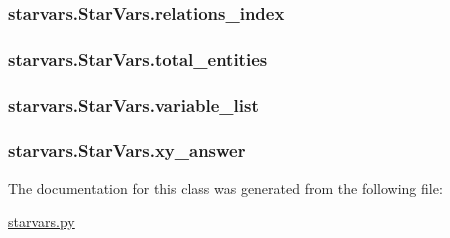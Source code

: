 \hypertarget{classstarvars_1_1StarVars_a228e7e86033c3b18aa6713a71cb17077}{
\subsubsection[{relations\-\_\-index}]{\setlength{\rightskip}{0pt plus 5cm}starvars.\-Star\-Vars.\-relations\-\_\-index}}\label{classstarvars_1_1StarVars_a228e7e86033c3b18aa6713a71cb17077}
\hypertarget{classstarvars_1_1StarVars_ae422b5451a6755af3cbd275608756ed1}{
\subsubsection[{total\-\_\-entities}]{\setlength{\rightskip}{0pt plus 5cm}starvars.\-Star\-Vars.\-total\-\_\-entities}}\label{classstarvars_1_1StarVars_ae422b5451a6755af3cbd275608756ed1}
\hypertarget{classstarvars_1_1StarVars_a49126602e2b9e3b37bf3935ec387997c}{
\subsubsection[{variable\-\_\-list}]{\setlength{\rightskip}{0pt plus 5cm}starvars.\-Star\-Vars.\-variable\-\_\-list}}\label{classstarvars_1_1StarVars_a49126602e2b9e3b37bf3935ec387997c}
\hypertarget{classstarvars_1_1StarVars_ac079b3194d890372bc64d1d6feb76874}{
\subsubsection[{xy\-\_\-answer}]{\setlength{\rightskip}{0pt plus 5cm}starvars.\-Star\-Vars.\-xy\-\_\-answer}}\label{classstarvars_1_1StarVars_ac079b3194d890372bc64d1d6feb76874}


The documentation for this class was generated from the following file\-:\begin{DoxyCompactItemize}
\item 
\hyperlink{starvars_8py}{starvars.\-py}\end{DoxyCompactItemize}
